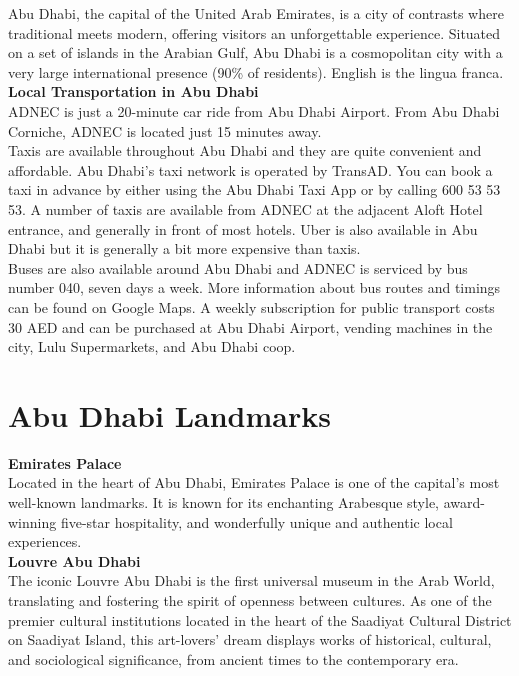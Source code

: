  Abu Dhabi, the capital of the United Arab Emirates, is a city of contrasts where traditional meets modern, offering visitors an unforgettable experience.
  Situated on a set of islands in the Arabian Gulf, Abu Dhabi is a cosmopolitan city with a very large international presence (90\% of residents).
 English is the lingua franca. \\

 {\large \textbf{Local Transportation in Abu Dhabi}}\\

 ADNEC is just a 20-minute car ride from Abu Dhabi Airport. From Abu Dhabi Corniche, ADNEC is located just 15 minutes away.\\
 Taxis are available throughout Abu Dhabi and they are quite convenient and affordable. Abu Dhabi’s taxi network is operated by TransAD.
You can book a taxi in advance by either using the Abu Dhabi Taxi App or by calling 600 53 53 53.
A number of taxis are available from ADNEC at the adjacent Aloft Hotel entrance, and generally in front of most hotels.
Uber is also available in Abu Dhabi but it is generally a bit more expensive than taxis.\\
Buses are also available around Abu Dhabi and ADNEC is serviced by bus number 040, seven days a week.
More information about bus routes and timings can be found on Google Maps.
A weekly subscription for public transport costs 30 AED and can be purchased at Abu Dhabi Airport, vending machines in the city, Lulu Supermarkets, and Abu Dhabi coop.\\


\section{Abu Dhabi Landmarks}

{\large \textbf{Emirates Palace}}\\
Located in the heart of Abu Dhabi, Emirates Palace is one of the capital’s most well-known landmarks.
It is known for its enchanting Arabesque style, award-winning five-star hospitality, and wonderfully unique and authentic local experiences.\\

{\large \textbf{Louvre Abu Dhabi}}\\
The iconic Louvre Abu Dhabi is the first universal museum in the Arab World, translating and fostering the spirit of openness between cultures.
 As one of the premier cultural institutions located in the heart of the Saadiyat Cultural District on Saadiyat Island,
  this art-lovers’ dream displays works of historical, cultural, and sociological significance, from ancient times to the contemporary era.\\
 
